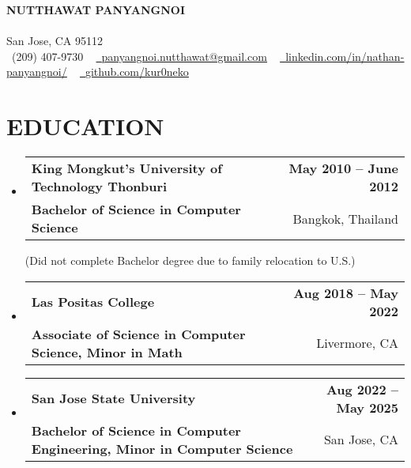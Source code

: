 \documentclass[letterpaper,11pt]{article}
\makeatletter
\newcommand{\resumeSubheading}[4]{
  \vspace{-2pt}\item
    \begin{tabular*}{1.0\textwidth}[t]{l@{\extracolsep{\fill}}r}
      \textbf{#1} & \textbf{\small #2} \\
      {\small#3} & {\small #4} \\
    \end{tabular*}\vspace{-7pt}
}
\newcommand{\resumeSubHeadingListStart}{\begin{itemize}[leftmargin=0.0in, label={}]}
\newcommand{\resumeSubHeadingListEnd}{\end{itemize}}
\makeatother
\begin{document}
\vspace{-10pt}
\begin{center}
    {\Huge \scshape\textbf {NUTTHAWAT PANYANGNOI}}\\ 
    \vspace{1pt}{https://kur0neko.com}\\ \vspace{1pt} 
    \vspace{0.5pt} San Jose, CA 95112 \\ \vspace{0.5pt}
    \small \raisebox{-0.1\height}\faPhone\ (209) 407-9730 ~ \href{mailto:panyangnoi.nutthawat@gmail.com}{\raisebox{-0.2\height}\faEnvelope\  \underline{panyangnoi.nutthawat@gmail.com}} ~ 
    \href{https://www.linkedin.com/in/nathan-panyangnoi/}{\raisebox{-0.2\height}\faLinkedin\ \underline{linkedin.com/in/nathan-panyangnoi/}}  ~
    \href{https://github.com/kur0neko}{\raisebox{-0.2\height}\faGithub\ \underline{github.com/kur0neko}}
    \vspace{-8pt}
\end{center}


\section{EDUCATION}

  \resumeSubHeadingListStart
    \resumeSubheading
      {King Mongkut’s University of Technology Thonburi}{May 2010 -- June 2012}
      {\textbf{Bachelor of Science in Computer Science}} {Bangkok, Thailand}
      \newline
      {(Did not complete Bachelor degree due to family relocation to U.S.) }
      \resumeSubheading
      {Las Positas College}{Aug 2018 -- May 2022}
      {\textbf{Associate of Science in Computer Science, Minor in Math}}{Livermore, CA}
    \resumeSubheading
      {San Jose State University}{Aug 2022 -- May 2025}
      {\textbf{Bachelor of Science in Computer Engineering, Minor in Computer Science}}{San Jose, CA}  
  \resumeSubHeadingListEnd

\end{document}
